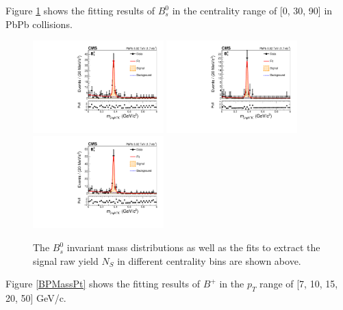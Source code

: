 Figure \ref{BsMassCent} shows the fitting results of $B^0_s$ in the centrality range of [0, 30, 90] in PbPb collisions.  

\begin{figure}[h]
\begin{center}
\includegraphics[width= 0.45\textwidth]{Figures/Chapter5/data_PbPb_1_BptNew_1050_doubly0_0_30EffInfoTreeFit.pdf}
\includegraphics[width= 0.45\textwidth]{Figures/Chapter5/data_PbPb_1_BptNew_1050_doubly0_30_90EffInfoTreeFit.pdf}
\includegraphics[width= 0.45\textwidth]{Figures/Chapter5/data_PbPb_1_BptNew_1050_doubly0_0_90EffInfoTreeFit.pdf}
\caption{The $B^0_s$ invariant mass distributions as well as the fits to extract the signal raw yield $N_{S}$ in different centrality bins are shown above.}
\label{BsMassCent}
\end{center}
\end{figure}

Figure \ref{BPMassPt} shows the fitting results of $B^+$ in the $p_T$ range of [7, 10, 15, 20, 50] GeV/c.  


